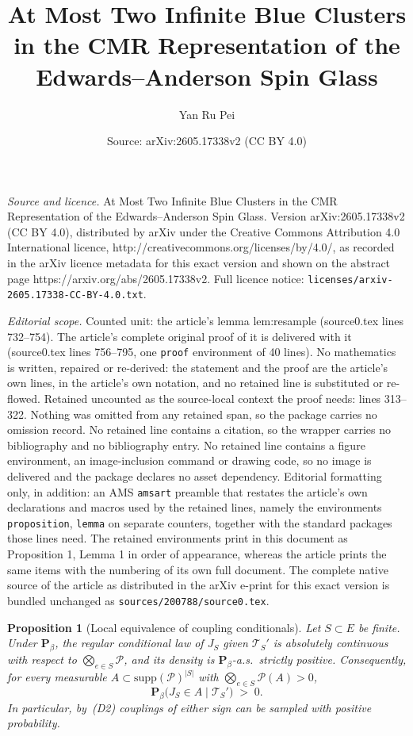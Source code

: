 \documentclass[10pt,a4paper]{amsart}
\title{At Most Two Infinite Blue Clusters in the CMR Representation of the Edwards--Anderson Spin Glass}
\author{Yan Ru Pei}
\date{Source: arXiv:2605.17338v2 (CC BY 4.0)}
\newtheorem{proposition}{Proposition}
\begin{document}
\maketitle

\noindent\emph{Source and licence.} At Most Two Infinite Blue Clusters in the CMR Representation of the Edwards--Anderson Spin Glass. Version arXiv:2605.17338v2 (CC BY 4.0), distributed by arXiv under the Creative Commons Attribution 4.0 International licence, http://creativecommons.org/licenses/by/4.0/, as recorded in the arXiv licence metadata for this exact version and shown on the abstract page https://arxiv.org/abs/2605.17338v2. Full licence notice: \texttt{licenses/arxiv-2605.17338-CC-BY-4.0.txt}.\par\smallskip

\noindent\textit{Editorial scope.} Counted unit: the article's lemma lem:resample (source0.tex lines 732--754). The article's complete original proof of it is delivered with it (source0.tex lines 756--795, one \texttt{proof} environment of 40 lines). No mathematics is written, repaired or re-derived: the statement and the proof are the article's own lines, in the article's own notation, and no retained line is substituted or re-flowed.  Retained uncounted as the source-local context the proof needs: lines 313--322.  Nothing was omitted from any retained span, so the package carries no omission record.  No retained line contains a citation, so the wrapper carries no bibliography and no bibliography entry.  No retained line contains a figure environment, an image-inclusion command or drawing code, so no image is delivered and the package declares no asset dependency.  Editorial formatting only, in addition: an AMS \texttt{amsart} preamble that restates the article's own declarations and macros used by the retained lines, namely the environments \texttt{proposition}, \texttt{lemma} on separate counters, together with the standard packages those lines need.  The retained environments print in this document as Proposition 1, Lemma 1 in order of appearance, whereas the article prints the same items with the numbering of its own full document.  The complete native source of the article as distributed in the arXiv e-print for this exact version is bundled unchanged as \texttt{sources/200788/source0.tex}.
\begin{proposition}[Local equivalence of coupling conditionals]\label{prop:bayes}
Let $S \subset E$ be finite.
Under $\mathbf{P}_\beta$, the regular conditional law of $J_S$ given $\mathcal{T}_S'$ is absolutely continuous with respect to $\bigotimes_{e \in S} \mathscr{P}$, and its density is $\mathbf{P}_\beta$-a.s.\ strictly positive.
Consequently, for every measurable $A \subset \mathrm{supp}(\mathscr{P})^{|S|}$ with $\bigotimes_{e \in S} \mathscr{P}(A) > 0$,
\begin{equation}\label{eq:bayes-positive}
  \mathbf{P}_\beta\bigl(J_S \in A \mid \mathcal{T}_S'\bigr)
  \;>\; 0.
\end{equation}
In particular, by~\textup{(D2)} couplings of either sign can be sampled with positive probability.
\end{proposition}
\end{document}

